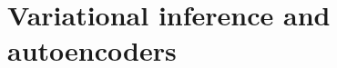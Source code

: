 \documentclass[english,graybox,envcountchap,envcountsame,sectrefs,shortlabels]{svmono}
\theoremstyle{style}
\newcommand{\gauss}{\mathcal{N}}
\begin{document}
%






\chapter{Variational inference and autoencoders}
\end{document}

